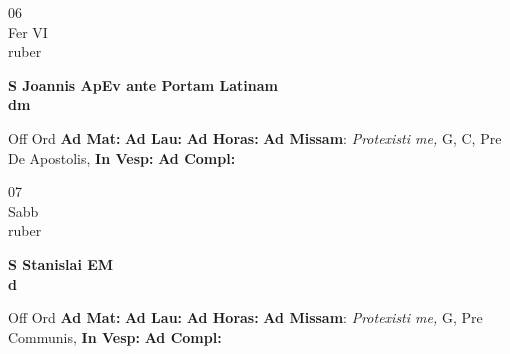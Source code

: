 \documentclass[10pt, openany]{book}
\begin{document}
        \begin{center}
            \begin{minipage}{3.5in}
                \vspace{2em}
                \begin{minipage}{0.5in}
                    {\Huge 06} \\
                    {\normalsize Fer VI} \\
                    {\normalsize ruber}
                \end{minipage}
                \begin{minipage}{3.0in}
                    \textbf{ \large S Joannis ApEv ante Portam Latinam \\
                    \textnormal{\normalsize dm}} \\ 
                \end{minipage}
                \begin{justify}Off Ord
                    \textbf{Ad Mat: }
                    \textbf{Ad Lau: }
                    \textbf{Ad Horas: }\textbf{Ad Missam}: \textit{Protexisti me,} G, C, Pre De Apostolis,  
                    \textbf{In Vesp: }
                    \textbf{Ad Compl: }
                \end{justify}
            \end{minipage}
        \end{center}
    
        \begin{center}
            \begin{minipage}{3.5in}
                \vspace{2em}
                \begin{minipage}{0.5in}
                    {\Huge 07} \\
                    {\normalsize Sabb} \\
                    {\normalsize ruber}
                \end{minipage}
                \begin{minipage}{3.0in}
                    \textbf{ \large S Stanislai EM \\
                    \textnormal{\normalsize d}} \\ 
                \end{minipage}
                \begin{justify}Off Ord
                    \textbf{Ad Mat: }
                    \textbf{Ad Lau: }
                    \textbf{Ad Horas: }\textbf{Ad Missam}: \textit{Protexisti me,} G, Pre Communis,  
                    \textbf{In Vesp: }
                    \textbf{Ad Compl: }
                \end{justify}
            \end{minipage}
        \end{center}
    
\end{document}
